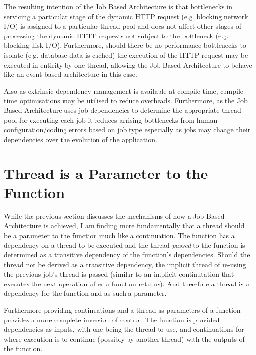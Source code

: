 \documentclass[conference]{ieee/IEEEtran}
\begin{document}
The resulting intention of the Job Based Architecture is that bottlenecks in
servicing a particular stage of the dynamic HTTP request (e.g. blocking network
I/O) is assigned to a particular thread pool and does not affect other stages of
processing the dynamic HTTP requests not subject to the bottleneck (e.g.
blocking disk I/O). Furthermore, should there be no performance bottlenecks to
isolate (e.g. database data is cached) the execution of the HTTP request may be
executed in entirity by one thread, allowing the Job Based Architecture to
behave like an event-based architecture in this case.

Also as extrinsic dependency management is available at compile time, compile
time optimisations may be utilised to reduce overheads.  Furthermore, as the Job
Based Architecture uses job dependencies to determine the appropriate thread
pool for executing each job it reduces arrising bottlenecks from human
configuration/coding errors based on job type especially as jobs may change
their dependencies over the evolution of the application.


\section{Thread is a Parameter to the Function}
While the previous section discusses the mechanisms of how a Job Based
Architecture is achieved, I am finding more fundamentally that a thread should
be a parameter to the function much like a continuation.  The function has a
dependency on a thread to be executed and the thread \textit{passed} to the
function is determined as a transitive dependency of the function's
dependencies.  Should the thread not be derived as a transitive dependency, the
implicit thread of re-using the previous job's thread is passed (similar to an
implicit continutation that executes the next operation after a function
returns).  And therefore a thread is a dependency for the function and as such a
parameter.

Furthermore providing continuations and a thread as parameters of a function
provides a more complete inversion of control.  The function is provided
dependencies as inputs, with one being the thread to use, and continuations for
where execution is to continue (possibly by another thread) with the outputs of
the function.
\end{document}
